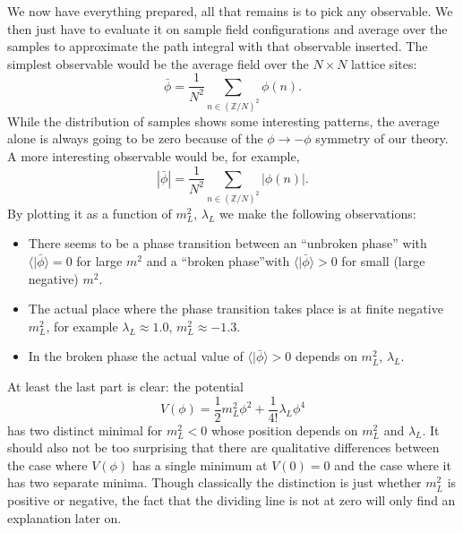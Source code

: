 \documentclass[12pt]{article}
\begin{document}
We now have everything prepared, all that remains is to pick any
observable. We then just have to evaluate it on sample field
configurations and average over the samples to approximate the path
integral with that observable inserted. The simplest observable would
be the average field over the $N\times N$ lattice sites:
\begin{equation}
  \bar\phi = \frac{1}{N^2} \sum_{n\in (\mathbb{Z}/N)^2} \phi(n).
\end{equation}
While the distribution of samples shows some interesting patterns, the
average alone is always going to be zero because of the $\phi\to
-\phi$ symmetry of our theory. A more interesting observable would be,
for example,
\begin{equation}
  |\bar\phi| = \frac{1}{N^2} \sum_{n\in (\mathbb{Z}/N)^2}  |\phi(n)|.
\end{equation}
By plotting it as a function of $m_L^2$, $\lambda_L$ we make the
following observations:
\begin{itemize}
\item There seems to be a phase transition between an ``unbroken
  phase'' with $\langle|\bar\phi\rangle=0$ for large $m^2$ and a
  ``broken phase''with $\langle|\bar\phi\rangle>0$ for small (large
  negative) $m^2$.
\item The actual place where the phase transition takes place is at
  finite negative $m_L^2$, for example $\lambda_L\approx 1.0$,
  $m_L^2\approx -1.3$.
\item In the broken phase the actual value of
  $\langle|\bar\phi\rangle>0$ depends on $m_L^2$, $\lambda_L$. 
\end{itemize}
At least the last part is clear: the potential 
\begin{equation}
  V(\phi) =
  \frac{1}{2}m_L^2 \phi^2 + \frac{1}{4!} \lambda_L \phi^4
\end{equation}
has two distinct minimal for $m_L^2 < 0$ whose position depends on
$m_L^2$ and $\lambda_L$. It should also not be too surprising that
there are qualitative differences between the case where $V(\phi)$ has
a single minimum at $V(0)=0$ and the case where it has two separate
minima. Though classically the distinction is just whether $m_L^2$ is
positive or negative, the fact that the dividing line is not at zero
will only find an explanation later on.
\end{document}
